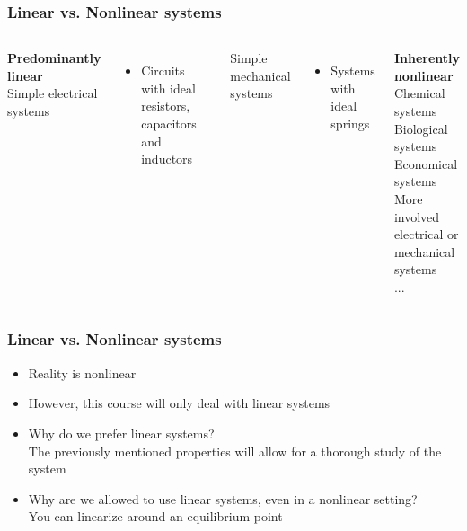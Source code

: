 \documentclass{beamer}
\begin{document}
	
	\begin{frame}
		\frametitle{Linear vs. Nonlinear systems}
		\vspace{-8ex}
		\begin{columns}
			\textbf{\Large{Predominantly linear}}\\
			\medskip
			Simple electrical systems
			\begin{itemize}
				\item Circuits with ideal resistors, capacitors and inductors
			\end{itemize}
			Simple mechanical systems
			\begin{itemize}
				\item Systems with ideal springs
			\end{itemize}
			\bigskip
			
			\textbf{\Large{Inherently nonlinear}}\\
			\medskip
			Chemical systems\\
			\smallskip
			Biological systems\\
			\smallskip
			Economical systems\\
			\smallskip
			More involved electrical or mechanical systems\\
			\smallskip
			...
		\end{columns}
	\end{frame}
	
	
	\begin{frame}
		\frametitle{Linear vs. Nonlinear systems}
		\vspace{-6ex}
		\begin{itemize}
			\item Reality is nonlinear
			\item However, this course will only deal with linear systems
			\item Why do we prefer linear systems? \\
			\medskip
			The previously mentioned properties will allow for a thorough study of the system
			\item Why are we allowed to use linear systems, even in a nonlinear setting?\\
			\medskip
			You can linearize around an equilibrium point
		\end{itemize}
	\end{frame}
	
\end{document}
